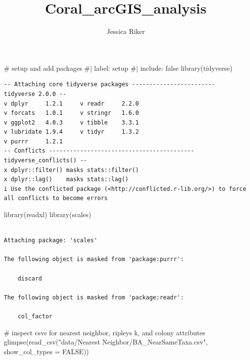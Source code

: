 \documentclass[
  letterpaper,
  DIV=11,
  numbers=noendperiod]{scrartcl}
\title{Coral\_arcGIS\_analysis}
\author{Jessica Riker}
\date{}
\newenvironment{Shaded}{\begin{snugshade}}{\end{snugshade}}
\newcommand{\AttributeTok}[1]{\textcolor[rgb]{0.40,0.45,0.13}{#1}}
\newcommand{\CommentTok}[1]{\textcolor[rgb]{0.37,0.37,0.37}{#1}}
\newcommand{\ConstantTok}[1]{\textcolor[rgb]{0.56,0.35,0.01}{#1}}
\newcommand{\FunctionTok}[1]{\textcolor[rgb]{0.28,0.35,0.67}{#1}}
\newcommand{\NormalTok}[1]{\textcolor[rgb]{0.00,0.23,0.31}{#1}}
\newcommand{\StringTok}[1]{\textcolor[rgb]{0.13,0.47,0.30}{#1}}
\begin{document}
\maketitle


\begin{Shaded}
\begin{Highlighting}[]
\CommentTok{\# setup and add packages}
\CommentTok{\#| label: setup}
\CommentTok{\#| include: false}
\FunctionTok{library}\NormalTok{(tidyverse)}
\end{Highlighting}
\end{Shaded}

\begin{verbatim}
-- Attaching core tidyverse packages ------------------------ tidyverse 2.0.0 --
v dplyr     1.2.1     v readr     2.2.0
v forcats   1.0.1     v stringr   1.6.0
v ggplot2   4.0.3     v tibble    3.3.1
v lubridate 1.9.4     v tidyr     1.3.2
v purrr     1.2.1     
-- Conflicts ------------------------------------------ tidyverse_conflicts() --
x dplyr::filter() masks stats::filter()
x dplyr::lag()    masks stats::lag()
i Use the conflicted package (<http://conflicted.r-lib.org/>) to force all conflicts to become errors
\end{verbatim}

\begin{Shaded}
\begin{Highlighting}[]
\FunctionTok{library}\NormalTok{(readxl)}
\FunctionTok{library}\NormalTok{(scales)}
\end{Highlighting}
\end{Shaded}

\begin{verbatim}

Attaching package: 'scales'

The following object is masked from 'package:purrr':

    discard

The following object is masked from 'package:readr':

    col_factor
\end{verbatim}

\begin{Shaded}
\begin{Highlighting}[]
\CommentTok{\# inspect csvs for nearest neighbor, ripleys k, and colony attributes}
\FunctionTok{glimpse}\NormalTok{(}\FunctionTok{read\_csv}\NormalTok{(}\StringTok{"data/Nearest Neighbor/BA\_NearSameTaxa.csv"}\NormalTok{, }\AttributeTok{show\_col\_types =} \ConstantTok{FALSE}\NormalTok{))}
\end{Highlighting}
\end{Shaded}
\end{document}

